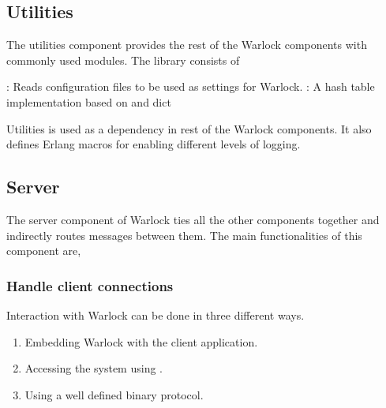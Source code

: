 \subsection{Utilities}

The utilities component provides the rest of the Warlock components with
commonly used modules. The library consists of

\begin{itemize}
    : Reads configuration files to be used as
    settings for Warlock.
    : A hash table implementation based on %
    and dict%
\end{itemize}

Utilities is used as a dependency in rest of the Warlock components. It also
defines Erlang macros%
for enabling different levels of logging.

\subsection{Server}

The server component of Warlock ties all the other components together and
indirectly routes messages between them. The main functionalities of this
component are,

\subsubsection{Handle client connections}
\label{section:a.n.d.client.conn}

Interaction with Warlock can be done in three different ways.

\begin{enumerate}
  \item Embedding Warlock with the client application.
  \item Accessing the system using .
  \item Using a well defined binary protocol.
\end{enumerate}

